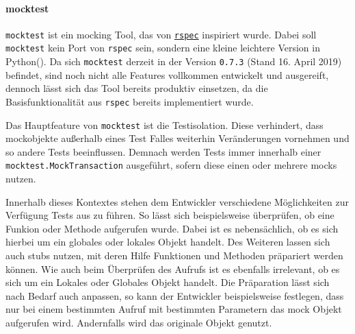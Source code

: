 \paragraph{mocktest}\label{python-tools:mocktest}\mbox{}
\newline
\lstinline{mocktest} ist ein \gls{mock}ing Tool, das von
\href{http://rspec.info/}{\lstinline{rspec}}
inspiriert wurde. Dabei soll \lstinline{mocktest} kein Port von
\lstinline{rspec} sein, sondern eine kleine leichtere
Version in Python(\cite{mocktest:doc}). Da sich \lstinline{mocktest} derzeit in
der Version \lstinline{0.7.3} (Stand 16. April 2019) befindet, sind noch nicht
alle Features vollkommen entwickelt und ausgereift, dennoch lässt sich das Tool
bereits produktiv einsetzen, da die Basisfunktionalität aus
\lstinline{rspec} bereits implementiert wurde.
\newline

Das Hauptfeature von \lstinline{mocktest} ist die Testisolation. Diese
verhindert, dass \Gls{mock}objekte außerhalb eines Test Falles weiterhin
Veränderungen vornehmen und so andere Tests beeinflussen. Demnach werden Tests
immer innerhalb einer \lstinline{mocktest.MockTransaction} ausgeführt, sofern
diese einen oder mehrere \Glspl{mock} nutzen.

Innerhalb dieses Kontextes stehen dem Entwickler verschiedene Möglichkeiten zur
Verfügung Tests aus zu führen. So lässt sich beispielsweise überprüfen, ob eine
Funkion oder Methode aufgerufen wurde. Dabei ist es nebensächlich, ob es sich
hierbei um ein globales oder lokales Objekt handelt. Des Weiteren lassen sich
auch \Glspl{stub} nutzen, mit deren Hilfe Funktionen und Methoden präpariert
werden können. Wie auch beim Überprüfen des Aufrufs ist es ebenfalls irrelevant,
ob es sich um ein Lokales oder Globales Objekt handelt.
Die Präparation lässt sich nach Bedarf auch anpassen, so kann der Entwickler
beispielsweise festlegen, dass nur bei einem bestimmten Aufruf mit bestimmten
Parametern das \Gls{mock} Objekt aufgerufen wird. Andernfalls wird das originale
Objekt genutzt.
\newline

